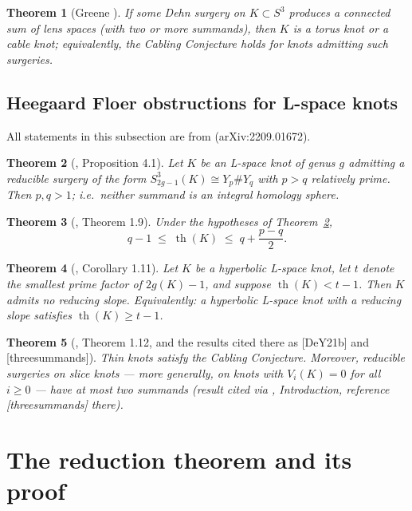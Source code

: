 \documentclass[11pt]{amsart}
\newtheorem{theorem}{Theorem}[section]
\theoremstyle{definition}
\theoremstyle{remark}
\numberwithin{equation}{section}
\begin{document}
\begin{theorem}[Greene \cite{Greene}]\label{thm:greene}
If some Dehn surgery on $K\subset S^{3}$ produces a connected sum of lens
spaces (with two or more summands), then $K$ is a torus knot or a cable
knot; equivalently, the Cabling Conjecture holds for knots admitting such
surgeries.
\end{theorem}

\subsection{Heegaard Floer obstructions for L-space knots}

All statements in this subsection are from \cite{ORS}
(arXiv:2209.01672).

\begin{theorem}[{\cite{ORS}, Proposition 4.1}]\label{thm:ors1}
Let $K$ be an L-space knot of genus $g$ admitting a reducible surgery of
the form
$S^{3}_{2g-1}(K)\cong Y_{p}\#Y_{q}$
with $p>q$ relatively prime. Then $p,q>1$; i.e.\ neither summand is an
integral homology sphere.
\end{theorem}

\begin{theorem}[{\cite{ORS}, Theorem 1.9}]\label{thm:ors2}
Under the hypotheses of Theorem~\ref{thm:ors1},
\[
q-1\;\le\;\operatorname{th}(K)\;\le\;q+\frac{p-q}{2}.
\]
\end{theorem}

\begin{theorem}[{\cite{ORS}, Corollary 1.11}]\label{thm:ors3}
Let $K$ be a hyperbolic L-space knot, let $t$ denote the smallest prime
factor of $2g(K)-1$, and suppose $\operatorname{th}(K)<t-1$. Then $K$
admits no reducing slope. Equivalently: a hyperbolic L-space knot with a
reducing slope satisfies $\operatorname{th}(K)\ge t-1$.
\end{theorem}

\begin{theorem}[{\cite{ORS}, Theorem 1.12, and the results cited there as
[DeY21b] and [threesummands]}]\label{thm:ors4}
Thin knots satisfy the Cabling Conjecture. Moreover, reducible surgeries
on slice knots --- more generally, on knots with $V_{i}(K)=0$ for all
$i\ge0$ --- have at most two summands (result cited via \cite{ORS},
Introduction, reference [threesummands] there).
\end{theorem}

\section{The reduction theorem and its proof}\label{sec:main}
\end{document}
